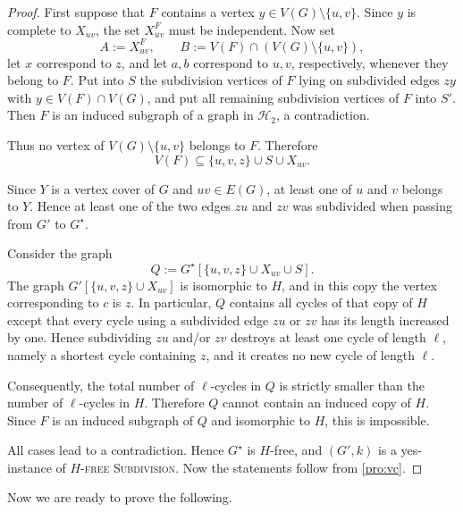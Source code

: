 \documentclass[a4paper,UKenglish,cleveref, autoref, thm-restate]{lipics-v2021}
\newcommand{\cH}{\mathcal{H}}
\begin{document}
\begin{proof}
First suppose that $F$ contains a vertex $y\in V(G)\setminus\{u,v\}$.
Since $y$ is complete to $X_{uv}$, the set $X_{uv}^F$ must be independent.
Now set
\[
A:=X_{uv}^F,\qquad B:=V(F)\cap (V(G)\setminus\{u,v\}),
\]
let $x$ correspond to $z$, and let $a,b$ correspond to $u,v$, respectively,
whenever they belong to $F$.
Put into $S$ the subdivision vertices of $F$ lying on subdivided edges $zy$ with
$y\in V(F)\cap V(G)$, and put all remaining subdivision vertices of $F$ into $S'$.
Then $F$ is an induced subgraph of a graph in $\cH_2$, a contradiction.

Thus no vertex of $V(G)\setminus\{u,v\}$ belongs to $F$.
Therefore
\[
V(F)\subseteq \{u,v,z\}\cup S\cup X_{uv}.
\]

Since $Y$ is a vertex cover of $G$ and $uv\in E(G)$, at least one of $u$ and $v$
belongs to $Y$.
Hence at least one of the two edges $zu$ and $zv$ was subdivided when passing from
$G'$ to $G^\star$.

Consider the graph
\[
Q:=G^\star[\{u,v,z\}\cup X_{uv}\cup S].
\]
The graph $G'[\{u,v,z\}\cup X_{uv}]$ is isomorphic to $H$, and in this copy the
vertex corresponding to $c$ is $z$.
In particular, $Q$ contains all cycles of that copy of $H$ except that every cycle
using a subdivided edge $zu$ or $zv$ has its length increased by one.
Hence subdividing $zu$ and/or $zv$ destroys at least one cycle of length $\ell$,
namely a shortest cycle containing $z$, and it creates no new cycle of length $\ell$.

Consequently, the total number of $\ell$-cycles in $Q$ is strictly smaller than the
number of $\ell$-cycles in $H$.
Therefore $Q$ cannot contain an induced copy of $H$.
Since $F$ is an induced subgraph of $Q$ and isomorphic to $H$, this is impossible.

All cases lead to a contradiction.
Hence $G^\star$ is $H$-free, and $(G',k)$ is a yes-instance of
\textsc{$H$-free Subdivision}.
Now the statements follow from \cref{pro:vc}.
\end{proof}

Now we are ready to prove the following.

\GirthFourLemmab*
\end{document}

